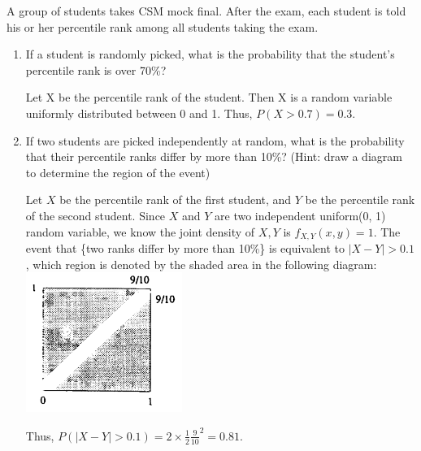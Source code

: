 \question A group of students takes CSM mock final. After the exam, each student is told his or her percentile rank among all students taking the exam. 

\begin{enumerate}[label=(\alph*)] 
\item If a student is randomly picked, what is the probability that the student's percentile rank is over 70\%? 
\begin{solution}[4cm] 
Let X be the percentile rank of the student. Then X is a random variable uniformly distributed between 0 and 1. Thus, $P(X > 0.7) = 0.3$. 
\end{solution}

\item If two students are picked independently at random, what is the probability that their percentile ranks differ by more than 10\%? (Hint: draw a diagram to determine the region of the event) 
\begin{solution}[4cm]
Let $X$ be the percentile rank of the first student, and $Y$ be the percentile rank of the second student. Since $X$ and $Y$ are two independent uniform(0, 1) random variable, we know the joint density of $X, Y$ is $f_{X, Y} (x, y) = 1$. The event that \{two ranks differ by more than 10\%\} is equivalent to $|X - Y| > 0.1$, which region is denoted by the shaded area in the following diagram: \\ 

\includegraphics[width=2in]{density.png} 

Thus, $P(|X - Y| > 0.1) = 2 \times \frac{1}{2} \frac{9}{10} ^ 2 = 0.81$. 

\end{solution}
\end{enumerate}